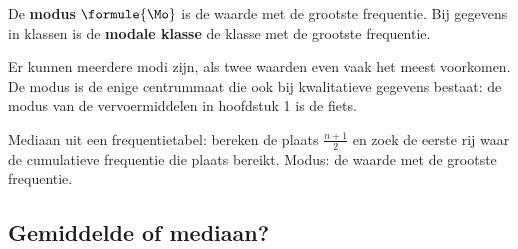 \begin{theorie}
De \textbf{\textcolor{accent}{modus}} $\formule{\Mo}$ is de waarde met de grootste frequentie. Bij gegevens in klassen is de \textbf{\textcolor{accent}{modale klasse}} de klasse met de grootste frequentie.
\end{theorie}

Er kunnen meerdere modi zijn, als twee waarden even vaak het meest voorkomen. De modus is de enige centrummaat die ook bij kwalitatieve gegevens bestaat: de modus van de vervoermiddelen in hoofdstuk 1 is de fiets.


\begin{werkwijze}
Mediaan uit een frequentietabel: bereken de plaats $\tfrac{n + 1}{2}$ en zoek de eerste rij waar de cumulatieve frequentie die plaats bereikt. Modus: de waarde met de grootste frequentie.
\end{werkwijze}

\begin{oefeningen}
\end{oefeningen}

\subsection{Gemiddelde of mediaan?}

